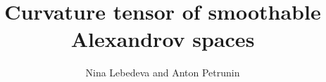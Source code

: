 \documentclass[a4paper,10pt]{article}
\begin{document}
\title{Curvature tensor of smoothable Alexandrov spaces}
\author{Nina Lebedeva and Anton Petrunin}
\maketitle










{\sloppy
\printbibliography[heading=bibintoc]
\fussy
}
\end{document}
